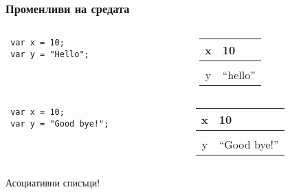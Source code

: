 \documentclass{beamer}
\begin{document}
\begin{frame}[fragile]
\frametitle{Променливи на средата}

\begin{columns}[t]
  \begin{column}{0.5\textwidth}
\begin{flushleft}
\begin{lstlisting}
 var x = 10;
 var y = "Hello"; 
\end{lstlisting}
\end{flushleft}
  \end{column}

  \begin{column}{0.5\textwidth}
\begin{flushleft}
\begin{tabular} {c | l}
  x   & 10 \\
      \hline\\
  y & ``hello''

\end{tabular}  
\end{flushleft}

  \end{column}
\end{columns}


\begin{columns}[t]
  \begin{column}{0.5\textwidth}
\begin{flushleft}
\begin{lstlisting}
 var x = 10;
 var y = "Good bye!"; 
\end{lstlisting}
\end{flushleft}
  \end{column}

  \begin{column}{0.5\textwidth}
\begin{flushleft}
\begin{tabular} {c | l}
  x   & 10 \\
      \hline\\
  y & ``Good bye!''

\end{tabular}  
\end{flushleft}

  \end{column}
\end{columns}
\end{frame}

\begin{frame}
  \centerline{Асоциативни списъци!}
\end{frame}
\end{document}
